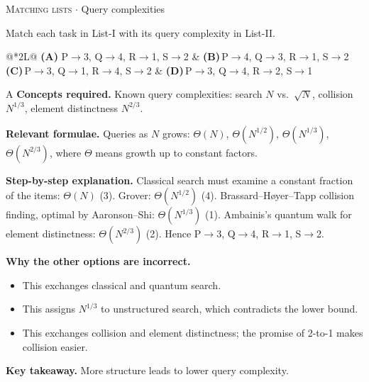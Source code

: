 \documentclass[11pt,a4paper]{article}
\newcommand{\optlabel}[1]{\textbf{(#1)}}
\newcommand{\correctlabel}[1]{\textcolor{okgreen}{\textbf{(#1)}\,\ding{51}}}
\newenvironment{qitem}[1]{\begin{list}{}{\setlength{\leftmargin}{3.3em}\setlength{\labelwidth}{3.1em}%
  \setlength{\labelsep}{0.2em}\setlength{\topsep}{3pt}\setlength{\parsep}{3pt}}\item[\textbf{Q.#1}\hfill]}{\end{list}}
\newcommand{\qsep}{\par\vspace{2pt}{\color{black!15}\hrule}\vspace{4pt}}
\newcommand{\qmeta}[2]{{\footnotesize\color{black!60}\textsc{#1} \;$\cdot$\; #2}\par}
\begin{document}
\begin{qitem}{75}
\qmeta{Matching lists}{Query complexities}
Match each task in List-I with its query complexity in List-II.
\par\smallskip{}
\par\smallskip\noindent\begin{tabularx}{\linewidth}{@{}*{2}{L}@{}}
\correctlabel{A}\,P$\to$3, Q$\to$4, R$\to$1, S$\to$2 & \optlabel{B}\,P$\to$4, Q$\to$3, R$\to$1, S$\to$2 \\[3pt]
\optlabel{C}\,P$\to$3, Q$\to$1, R$\to$4, S$\to$2 & \optlabel{D}\,P$\to$3, Q$\to$4, R$\to$2, S$\to$1
\end{tabularx}
\end{qitem}
\begin{solbox}{A}
\textbf{\color{brand}Concepts required.} Known query complexities: search $N$ vs.\ $\sqrt N$, collision $N^{1/3}$, element distinctness $N^{2/3}$.

\textbf{\color{brand}Relevant formulae.} Queries as $N$ grows: $\Theta(N)$, $\Theta(N^{1/2})$, $\Theta(N^{1/3})$, $\Theta(N^{2/3})$, where $\Theta$ means growth up to constant factors.

\textbf{\color{brand}Step-by-step explanation.} Classical search must examine a constant fraction of the items: $\Theta(N)$ (3). Grover: $\Theta(N^{1/2})$ (4). Brassard--H{\o}yer--Tapp collision finding, optimal by Aaronson--Shi: $\Theta(N^{1/3})$ (1). Ambainis's quantum walk for element distinctness: $\Theta(N^{2/3})$ (2).
Hence P$\to$3, Q$\to$4, R$\to$1, S$\to$2.

\textbf{\color{brand}Why the other options are incorrect.}
\begin{itemize}[leftmargin=2.4em, itemsep=1pt, topsep=2pt]
\item[\textbf{(B)}] This exchanges classical and quantum search.
\item[\textbf{(C)}] This assigns $N^{1/3}$ to unstructured search, which contradicts the lower bound.
\item[\textbf{(D)}] This exchanges collision and element distinctness; the promise of 2-to-1 makes collision easier.
\end{itemize}
\textbf{\color{brand}Key takeaway.} More structure leads to lower query complexity.
\end{solbox}
\qsep
\end{document}
